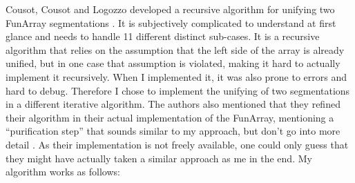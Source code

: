 Cousot, Cousot and Logozzo developed a recursive algorithm for unifying two FunArray segmentations \cite{cousot2011}. It is subjectively complicated to understand at first glance and needs to handle 11 different distinct sub-cases. It is a recursive algorithm that relies on the assumption that the left side of the array is already unified, but in one case that assumption is violated, making it hard to actually implement it recursively. When I implemented it, it was also prone to errors and hard to debug. Therefore I chose to implement the unifying of two segmentations in a different iterative algorithm. The authors also mentioned that they refined their algorithm in their actual implementation of the FunArray, mentioning a ``purification step'' that sounds similar to my approach, but don't go into more detail \cite[section 12.2]{cousot2011}. As their implementation is not freely available, one could only guess that they might have actually taken a similar approach as me in the end. My algorithm works as follows:
